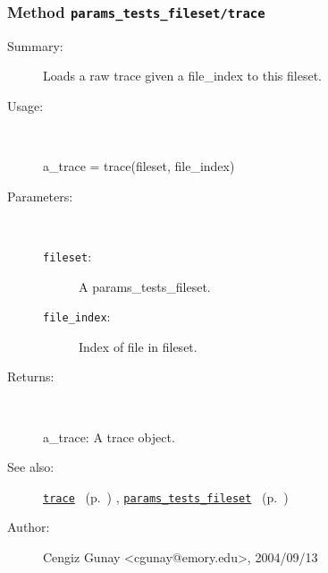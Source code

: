 \subsubsection[Method \texttt{trace}]{Method \texttt{params\_tests\_fileset/trace}}%
%
\label{ref_params_tests_fileset__trace}%
\hypertarget{ref_params_tests_fileset__trace}{}%
\begin{description}
\item[Summary:]Loads a raw trace given a file\_index to this fileset.
%
\item[Usage:]~%
\begin{lyxcode}%
a\_trace = trace(fileset, file\_index)
%
\end{lyxcode}%
%
%
\item[Parameters:]~
\begin{description}%
\item[\texttt{fileset}:]
 A params\_tests\_fileset.
\item[\texttt{file\_index}:]
 Index of file in fileset.
\end{description}%
%
\item[Returns:]~

	a\_trace: A trace object.
%
%
\item[See also:]%
\hyperlink{ref_trace}{\texttt{trace}}%
\ (p.~\pageref{ref_trace})%
%
, \hyperlink{ref_params_tests_fileset}{\texttt{params\_tests\_fileset}}%
\ (p.~\pageref{ref_params_tests_fileset})%
%
%
\item[Author:]%
Cengiz Gunay <cgunay@emory.edu>, 2004/09/13%
\end{description}
\methodline%
